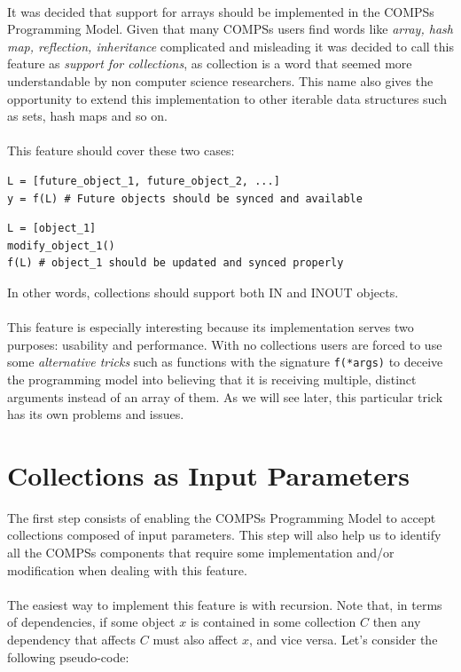 \\
It was decided that support for arrays should be implemented in the COMPSs Programming Model. Given that many COMPSs users find words like \textit{array, hash map, reflection, inheritance} complicated and misleading it was decided to call this feature as \textit{support for collections}, as collection is a word that seemed more understandable by non computer science researchers. This name also gives the opportunity to extend this implementation to other iterable data structures such as sets, hash maps and so on.\\
\\
This feature should cover these two cases:
\begin{verbatim}
L = [future_object_1, future_object_2, ...]
y = f(L) # Future objects should be synced and available
\end{verbatim}

\begin{verbatim}
L = [object_1]
modify_object_1()
f(L) # object_1 should be updated and synced properly
\end{verbatim}
In other words, collections should support both IN and INOUT objects.\\
\\
This feature is especially interesting because its implementation serves two purposes: usability and performance. With no collections users are forced to use some \textit{alternative tricks} such as functions with the signature \verb|f(*args)| to deceive the programming model into believing that it is receiving multiple, distinct arguments instead of an array of them. As we will see later, this particular trick has its own problems and issues.

\section{Collections as Input Parameters}
\label{subsec:col_in}
The first step consists of enabling the COMPSs Programming Model to accept collections composed of input parameters. This step will also help us to identify all the COMPSs components that require some implementation and/or modification when dealing with this feature.\\
\\
The easiest way to implement this feature is with recursion. Note that, in terms of dependencies, if some object $x$ is contained in some collection $C$ then any dependency that affects $C$ must also affect $x$, and vice versa. Let's consider the following pseudo-code:

